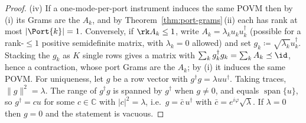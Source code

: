 \begin{proof}
(iv) If a one-mode-per-port instrument induces the same POVM then by (i) its
Grams are the $A_k$, and by Theorem~\ref{thm:port-grams}\,(ii) each has rank at most
$|\Port{k}|=1$. Conversely, if $\rk A_k\le1$, write
$A_k=\lambda_ku_ku_k^\dagger$ (possible for a rank-$\le1$ positive semidefinite
matrix, with $\lambda_k=0$ allowed) and set
$g_k\coloneqq\sqrt{\lambda_k}u_k^\dagger$. Stacking the $g_k$ as $K$ single
rows gives a matrix with $\sum_kg_k^\dagger g_k=\sum_kA_k\preceq\id$, hence a
contraction, whose port Grams are the $A_k$; by (i) it induces the same POVM.
For uniqueness, let $g$ be a row vector with $g^\dagger g=\lambda uu^\dagger$.
Taking traces, $\lVert g\rVert^2=\lambda$. The range of $g^\dagger g$ is spanned
by $g^\dagger$ when $g\neq0$, and equals $\operatorname{span}\{u\}$, so
$g^\dagger=cu$ for some $c\in\mathbb{C}$ with $|c|^2=\lambda$, i.e.\
$g=\bar c\,u^\dagger$ with $\bar c=e^{i\varphi}\sqrt\lambda$. If $\lambda=0$
then $g=0$ and the statement is vacuous.
\end{proof}
